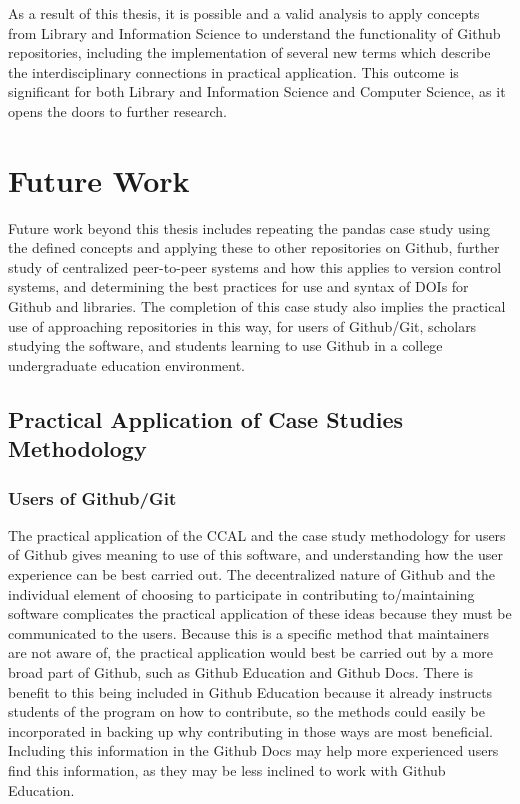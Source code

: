 As a result of this thesis, it is possible and a valid analysis to apply concepts from Library and Information Science to understand the functionality of Github repositories, including the implementation of several new terms which describe the interdisciplinary connections in practical application. This outcome is significant for both Library and Information Science and Computer Science, as it opens the doors to further research. 

\section{Future Work}

Future work beyond this thesis includes repeating the pandas case study using the defined concepts and applying these to other repositories on Github, further study of centralized peer-to-peer systems and how this applies to version control systems, and determining the best practices for use and syntax of DOIs for Github and libraries. The completion of this case study also implies the practical use of approaching repositories in this way, for users of Github/Git, scholars studying the software, and students learning to use Github in a college undergraduate education environment. 

\subsection{Practical Application of Case Studies Methodology}

\subsubsection{Users of Github/Git}

The practical application of the CCAL and the case study methodology for users of Github gives meaning to use of this software, and understanding how the user experience can be best carried out. The decentralized nature of Github and the individual element of choosing to participate in contributing to/maintaining software complicates the practical application of these ideas because they must be communicated to the users. Because this is a specific method that maintainers are not aware of, the practical application would best be carried out by a more broad part of Github, such as Github Education and Github Docs. There is benefit to this being included in Github Education because it already instructs students of the program on how to contribute, so the methods could easily be incorporated in backing up why contributing in those ways are most beneficial. Including this information in the Github Docs may help more experienced users find this information, as they may be less inclined to work with Github Education. 

